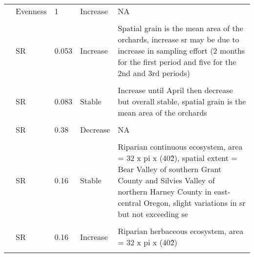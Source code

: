 \documentclass[
  12pt,
  oneside]{report}
\begin{document}
\begin{landscape}
\begin{longtable}[t]{llll>{\raggedright\arraybackslash}p{30em}}
\cite{davey_rise_2012} & Evenness & 1 & Increase & NA\\
\cellcolor{gray!6}{\cite{christian_more_2009}} & \cellcolor{gray!6}{SR} & \cellcolor{gray!6}{15.4} & \cellcolor{gray!6}{Increase} & \cellcolor{gray!6}{Temporal grains varies a lot,significant increase of SR}\\
\addlinespace
\cite{dittrich_multiyear_2019} & SR & 0.053 & Increase & Spatial grain is the mean area of the orchards, increase sr may be due to increase in sampling effort (2 months for the first period and five for the 2nd and 3rd \vphantom{1} periods)\\
\cellcolor{gray!6}{\cite{dittrich_multiyear_2019}} & \cellcolor{gray!6}{SR} & \cellcolor{gray!6}{0.053} & \cellcolor{gray!6}{Increase} & \cellcolor{gray!6}{Spatial grain is the mean area of the orchards, increase sr may be due to increase in sampling effort (2 months for the first period and five for the 2nd and 3rd periods)}\\
\cite{dittrich_multiyear_2019} & SR & 0.083 & Stable & Increase until April then decrease but overall stable, spatial grain is the mean area of the orchards\\
\cellcolor{gray!6}{\cite{dittrich_multiyear_2019}} & \cellcolor{gray!6}{SR} & \cellcolor{gray!6}{0.083} & \cellcolor{gray!6}{Stable} & \cellcolor{gray!6}{Spatial grain is the mean area of the orchards}\\
\cite{sirami_changes_2012} & SR & 0.38 & Decrease & NA\\
\addlinespace
\cellcolor{gray!6}{\cite{garcia-navas_temporal_2020}} & \cellcolor{gray!6}{Spatial beta-diversity} & \cellcolor{gray!6}{267} & \cellcolor{gray!6}{Decrease} & \cellcolor{gray!6}{sorensen score}\\
\cite{ellis_twenty-year_2019} & SR & 0.16 & Stable & Riparian continuous ecosystem, area = 32 x pi x (40\^2), spatial extent = Bear Valley of southern Grant County and Silvies Valley of northern Harney County in east-central Oregon, slight variations in sr but not exceeding se\\
\cellcolor{gray!6}{\cite{ellis_twenty-year_2019}} & \cellcolor{gray!6}{SR} & \cellcolor{gray!6}{0.16} & \cellcolor{gray!6}{Stable} & \cellcolor{gray!6}{Riparian discontinuous ecosystem, area = 32 x pi x (40\^2)}\\
\cite{ellis_twenty-year_2019} & SR & 0.16 & Increase & Riparian herbaceous ecosystem, area = 32 x pi x (40\^2)\\
\cellcolor{gray!6}{\cite{ellis_twenty-year_2019}} & \cellcolor{gray!6}{SR} & \cellcolor{gray!6}{0.48} & \cellcolor{gray!6}{Stable} & \cellcolor{gray!6}{Riparian total ecosystem, area = 32 x pi x (40\^2) x 3}\\

\end{longtable}
\end{landscape}
\end{document}
